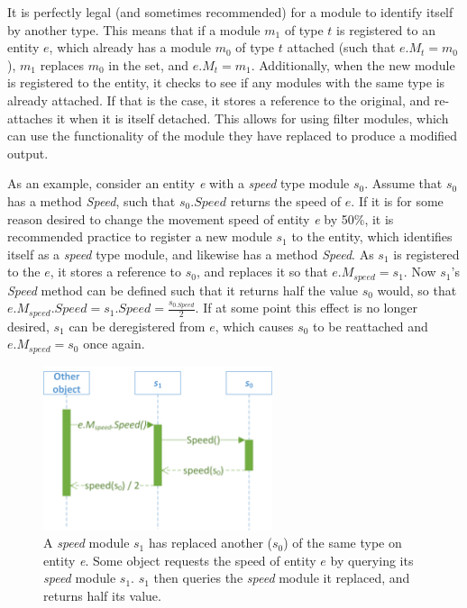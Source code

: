 It is perfectly legal (and sometimes recommended) for a module to
identify itself by another type. This means that if a module $m_{1}$
of type $t$ is registered to an entity $e$, which already has a
module $m_{0}$ of type $t$ attached (such that $e.M_{t}=m_{0}$),
$m_{1}$ replaces $m_{0}$ in the set, and $e.M_{t}=m_{1}$. Additionally,
when the new module is registered to the entity, it checks to see
if any modules with the same type is already attached. If that is
the case, it stores a reference to the original, and re-attaches it
when it is itself detached. This allows for using filter modules,
which can use the functionality of the module they have replaced to
produce a modified output.

As an example, consider an entity \emph{e} with a \emph{speed} type
module $s_{0}$. Assume that $s_{0}$ has a method \emph{Speed}, such
that $s_{0}.Speed$ returns the speed of $e$. If it is for some reason
desired to change the movement speed of entity \emph{e} by 50\%, it
is recommended practice to register a new module $s_{1}$ to the entity,
which identifies itself as a \emph{speed} type module, and likewise
has a method \emph{Speed}. As $s_{1}$ is registered to the $e$,
it stores a reference to $s_{0}$, and replaces it so that $e.M_{speed}=s_{1}$.
Now $s_{1}$'s \emph{Speed} method can be defined such that it returns
half the value $s_{0}$ would, so that $e.M_{speed}.Speed=s_{1}.Speed=\frac{s_{0.Speed}}{2}$.
If at some point this effect is no longer desired, $s_{1}$ can be
deregistered from $e$, which causes $s_{0}$ to be reattached and
$e.M_{speed}=s_{0}$ once again.

\begin{figure}
\begin{centering}
\includegraphics[width=0.6\textwidth]{ModulesChainingExample}
\par\end{centering}

\caption{A \emph{speed} module $s_{1}$ has replaced another ($s_{0}$) of
the same type on entity \emph{e}.\emph{ }Some object requests the
speed of entity $e$ by querying its \emph{speed} module $s_{1}$.
$s_{1}$ then queries the \emph{speed} module it replaced, and returns
half its value.}
\end{figure}


